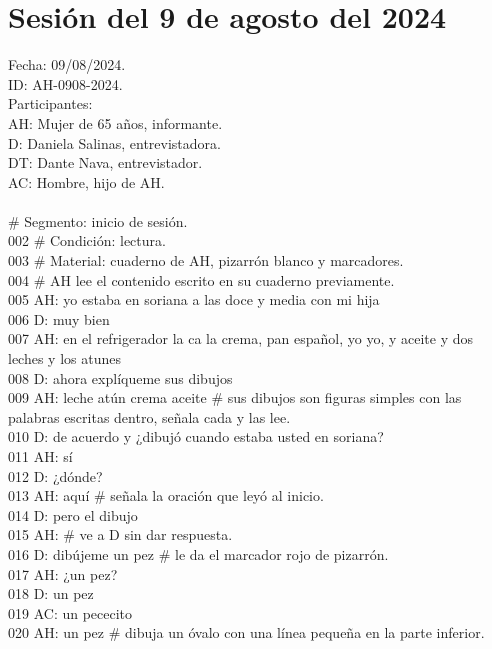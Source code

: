 \section{Sesión del 9 de agosto del 2024}

\noindent
Fecha: 09/08/2024.\\
ID: AH-0908-2024.\\
Participantes:\\
AH: Mujer de 65 años, informante.\\
D: Daniela Salinas, entrevistadora. \\
DT: Dante Nava, entrevistador.\\
AC: Hombre, hijo de AH.\\
\\
 \# Segmento: inicio de sesión.\\
002 \# Condición: lectura.\\
003 \# Material: cuaderno de AH, pizarrón blanco y marcadores.\\
004 \# AH lee el contenido escrito en su cuaderno previamente.\\
005 AH: yo estaba en soriana a las doce y media con mi hija\\
006 D: muy bien\\
007 AH: en el refrigerador la ca la crema, pan español, yo yo, y aceite y dos leches y los atunes\\
008 D: ahora explíqueme sus dibujos\\
009 AH: leche atún crema aceite \# sus dibujos son figuras simples con las palabras escritas dentro, señala cada y las lee.\\
010 D: de acuerdo y ¿dibujó cuando estaba usted en soriana?\\
011 AH: sí\\
012 D: ¿dónde?\\
013 AH: aquí \# señala la oración que leyó al inicio.\\
014 D: pero el dibujo\\
015 AH: \# ve a D sin dar respuesta.\\
016 D: dibújeme un pez \# le da el marcador rojo de pizarrón.\\
017 AH: ¿un pez?\\
018 D: un pez\\
019 AC: un pececito\\
020 AH: un pez \# dibuja un óvalo con una línea pequeña en la parte inferior.\\
